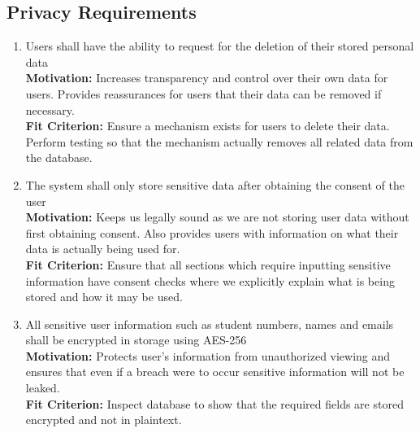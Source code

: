 \documentclass[12pt]{article}
\begin{document}
\subsection{Privacy Requirements}
\begin{enumerate}[align=left,
  leftmargin=*,
  labelsep=1em,
  itemindent=0em,
  label=\bfseries PV-\arabic*:,
  ref=\bfseries PV-\arabic*]
  \item \label{SPR1} Users shall have the ability to request for the deletion of their stored personal data\\[2mm]
    {\bf Motivation:} Increases transparency and control over their own data for users. Provides reassurances for users that their data can be removed if necessary.    \\
    {\bf Fit Criterion:} Ensure a mechanism exists for users to delete their data. Perform testing so that the mechanism actually removes all related data from the database.
  \item \label{SPR2} The system shall only store sensitive data after obtaining the consent of the user \\[2mm]
    {\bf Motivation:} Keeps us legally sound as we are not storing user data without first obtaining consent. Also provides users with information on what their data is actually being used for.  \\
    {\bf Fit Criterion:} Ensure that all sections which require inputting sensitive information have consent checks where we explicitly explain what is being stored and how it may be used. \\
  \item \label{SPR3} All sensitive user information such as student numbers, names and emails shall be encrypted in storage using AES-256\\[2mm]
    {\bf Motivation:} Protects user's information from unauthorized viewing and ensures that even if a breach were to occur sensitive information will not be leaked.   \\
    {\bf Fit Criterion:} Inspect database to show that the required fields are stored encrypted and not in plaintext. \\
\end{enumerate}
\end{document}
